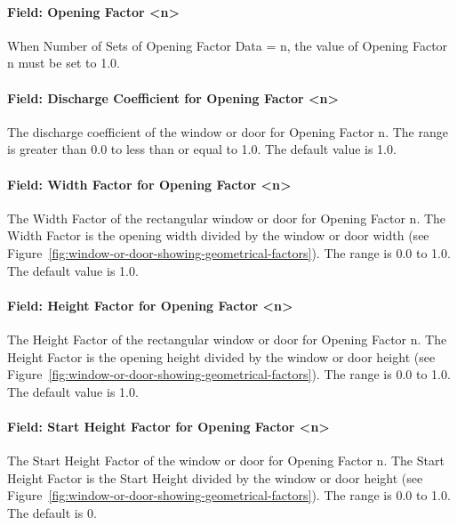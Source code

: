 \paragraph{Field: Opening Factor \textless{}n\textgreater{}}\label{field-opening-factor-n}

When Number of Sets of Opening Factor Data = n, the value of Opening Factor n must be set to 1.0.

\paragraph{Field: Discharge Coefficient for Opening Factor \textless{}n\textgreater{}}\label{field-discharge-coefficient-for-opening-factor-n}

The discharge coefficient of the window or door for Opening Factor n. The range is greater than 0.0 to less than or equal to 1.0. The default value is 1.0.

\paragraph{Field: Width Factor for Opening Factor \textless{}n\textgreater{}}\label{field-width-factor-for-opening-factor-n}

The Width Factor of the rectangular window or door for Opening Factor n. The Width Factor is the opening width divided by the window or door width (see Figure~\ref{fig:window-or-door-showing-geometrical-factors}). The range is 0.0 to 1.0. The default value is 1.0.

\paragraph{Field: Height Factor for Opening Factor \textless{}n\textgreater{}}\label{field-height-factor-for-opening-factor-n}

The Height Factor of the rectangular window or door for Opening Factor n. The Height Factor is the opening height divided by the window or door height (see Figure~\ref{fig:window-or-door-showing-geometrical-factors}). The range is 0.0 to 1.0. The default value is 1.0.

\paragraph{Field: Start Height Factor for Opening Factor \textless{}n\textgreater{}}\label{field-start-height-factor-for-opening-factor-n}

The Start Height Factor of the window or door for Opening Factor n. The Start Height Factor is the Start Height divided by the window or door height (see Figure~\ref{fig:window-or-door-showing-geometrical-factors}). The range is 0.0 to 1.0. The default is 0.

